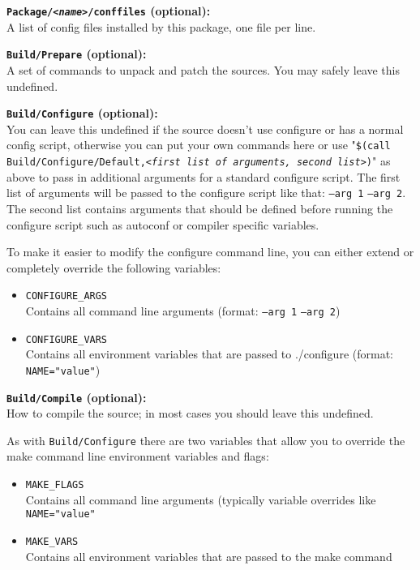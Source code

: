 \textbf{\texttt{Package/\textit{<name>}/conffiles} (optional):} \\
   A list of config files installed by this package, one file per line.

\textbf{\texttt{Build/Prepare} (optional):} \\
   A set of commands to unpack and patch the sources. You may safely leave this
   undefined.

\textbf{\texttt{Build/Configure} (optional):} \\
   You can leave this undefined if the source doesn't use configure or has a
   normal config script, otherwise you can put your own commands here or use
   "\texttt{\$(call Build/Configure/Default,\textit{<first list of arguments, second list>})}" as above to
   pass in additional arguments for a standard configure script. The first list of arguments will be passed
   to the configure script like that: \texttt{--arg 1} \texttt{--arg 2}. The second list contains arguments that should be
   defined before running the configure script such as autoconf or compiler specific variables.
   
   To make it easier to modify the configure command line, you can either extend or completely override the following variables:
   \begin{itemize}
     \item \texttt{CONFIGURE\_ARGS} \\
	     Contains all command line arguments (format: \texttt{--arg 1} \texttt{--arg 2})
     \item \texttt{CONFIGURE\_VARS} \\
	     Contains all environment variables that are passed to ./configure (format: \texttt{NAME="value"})
   \end{itemize}

\textbf{\texttt{Build/Compile} (optional):} \\
   How to compile the source; in most cases you should leave this undefined.
   
   As with \texttt{Build/Configure} there are two variables that allow you to override
   the make command line environment variables and flags:
   \begin{itemize}
     \item \texttt{MAKE\_FLAGS} \\
	   Contains all command line arguments (typically variable overrides like \texttt{NAME="value"}
	 \item \texttt{MAKE\_VARS} \\
	   Contains all environment variables that are passed to the make command
   \end{itemize}

